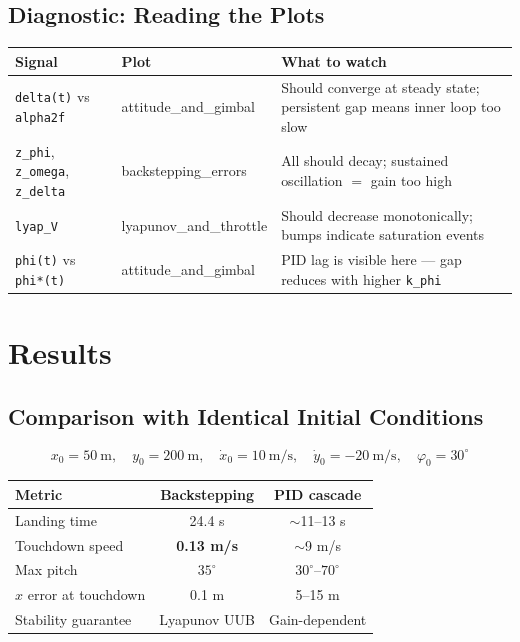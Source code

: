 \documentclass[11pt,a4paper]{article}
\begin{document}
\subsection{Diagnostic: Reading the Plots}

\begin{center}
\begin{tabular}{llp{7cm}}
\toprule
Signal & Plot & What to watch \\
\midrule
\texttt{delta(t)} vs \texttt{alpha2f}     & attitude\_and\_gimbal   & Should converge at steady state; persistent gap means inner loop too slow \\
\texttt{z\_phi}, \texttt{z\_omega}, \texttt{z\_delta} & backstepping\_errors & All should decay; sustained oscillation $=$ gain too high \\
\texttt{lyap\_V}                          & lyapunov\_and\_throttle & Should decrease monotonically; bumps indicate saturation events \\
\texttt{phi(t)} vs \texttt{phi*(t)}       & attitude\_and\_gimbal   & PID lag is visible here --- gap reduces with higher \texttt{k\_phi} \\
\bottomrule
\end{tabular}
\end{center}

\section{Results}

\subsection{Comparison with Identical Initial Conditions}

\[
  x_0 = 50\ \text{m},\quad y_0 = 200\ \text{m},\quad \dot x_0 = 10\ \text{m/s},\quad \dot y_0 = -20\ \text{m/s},\quad \varphi_0 = 30^{\circ}
\]

\begin{center}
\begin{tabular}{lcc}
\toprule
Metric & Backstepping & PID cascade \\
\midrule
Landing time          & 24.4 s        & $\sim$11--13 s \\
Touchdown speed       & \textbf{0.13 m/s} & $\sim$9 m/s \\
Max pitch             & $35^{\circ}$  & $30^{\circ}$--$70^{\circ}$ \\
$x$ error at touchdown & 0.1 m       & 5--15 m \\
Stability guarantee   & Lyapunov UUB & Gain-dependent \\
\bottomrule
\end{tabular}
\end{center}
\end{document}
